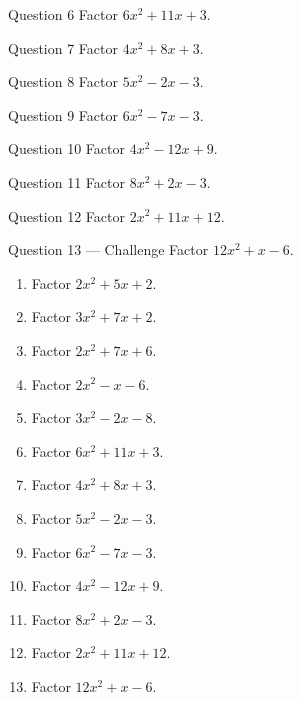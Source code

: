 \documentclass[11pt]{article}
\begin{document}
\begin{qbox}{Question 6}
Factor $6x^2+11x+3$.\workspace{2.2cm}
\end{qbox}

\begin{qbox}{Question 7}
Factor $4x^2+8x+3$.\workspace{2.0cm}
\end{qbox}

\begin{qbox}{Question 8}
Factor $5x^2-2x-3$.\workspace{2.2cm}
\end{qbox}

\begin{qbox}{Question 9}
Factor $6x^2-7x-3$.\workspace{2.2cm}
\end{qbox}

\begin{qbox}{Question 10}
Factor $4x^2-12x+9$.\workspace{2.0cm}
\end{qbox}

\begin{qbox}{Question 11}
Factor $8x^2+2x-3$.\workspace{2.2cm}
\end{qbox}

\begin{qbox}{Question 12}
Factor $2x^2+11x+12$.\workspace{2.2cm}
\end{qbox}

\begin{qbox}{Question 13 --- Challenge}
Factor $12x^2+x-6$.\workspace{2.6cm}
\end{qbox}

\clearpage
{}

\begin{recapbox}
\begin{multicols}{2}
\small
\begin{enumerate}[leftmargin=*,itemsep=3pt]
  \item Factor $2x^2+5x+2$.
  \item Factor $3x^2+7x+2$.
  \item Factor $2x^2+7x+6$.
  \item Factor $2x^2-x-6$.
  \item Factor $3x^2-2x-8$.
  \item Factor $6x^2+11x+3$.
  \item Factor $4x^2+8x+3$.
  \item Factor $5x^2-2x-3$.
  \item Factor $6x^2-7x-3$.
  \item Factor $4x^2-12x+9$.
  \item Factor $8x^2+2x-3$.
  \item Factor $2x^2+11x+12$.
  \item Factor $12x^2+x-6$.
\end{enumerate}
\end{multicols}
\end{recapbox}
\end{document}
